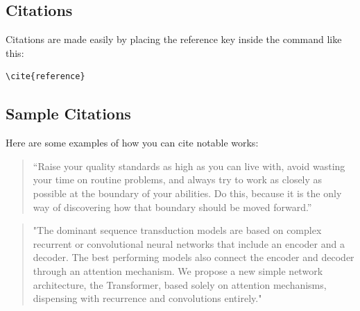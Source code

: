 \documentclass{article}
\begin{document}
\subsection*{Citations}
Citations are made easily by placing the reference key inside the command like this:
\begin{verbatim}
\cite{reference}
\end{verbatim}

\subsection*{Sample Citations}
Here are some examples of how you can cite notable works:

\begin{quote}
    \centering
    “Raise your quality standards as high as you can live with, avoid wasting your time on routine problems, and always try to work as closely as possible at the boundary of your abilities. Do this, because it is the only way of discovering how that boundary should be moved forward.” \cite{dijkstra1982selected}
\end{quote}

\begin{quote}
    \centering
    "The dominant sequence transduction models are based on complex recurrent or convolutional neural networks that include an encoder and a decoder. The best performing models also connect the encoder and decoder through an attention mechanism. We propose a new simple network architecture, the Transformer, based solely on attention mechanisms, dispensing with recurrence and convolutions entirely." \cite{vaswani2017attention}
\end{quote}



 
\end{document}
